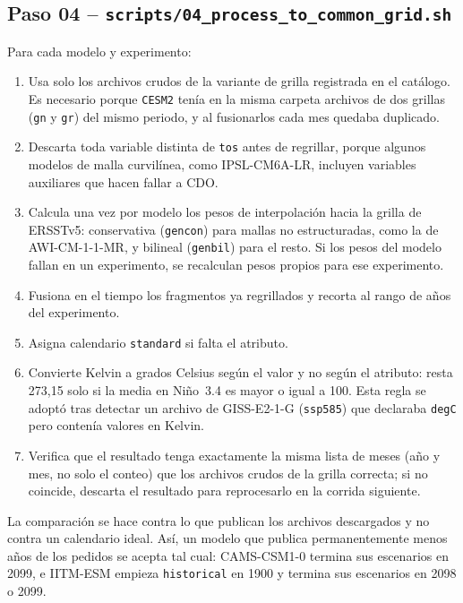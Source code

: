 \subsection{Paso 04 -- \texttt{scripts/04\_process\_to\_common\_grid.sh}}
\label{sec:paso04}
Para cada modelo y experimento:
\begin{enumerate}[label=(\arabic*)]
\item Usa solo los archivos crudos de la variante de grilla registrada en el catálogo. Es necesario porque \texttt{CESM2} tenía en la misma carpeta archivos de dos grillas (\texttt{gn} y \texttt{gr}) del mismo periodo, y al fusionarlos cada mes quedaba duplicado.
\item Descarta toda variable distinta de \texttt{tos} antes de regrillar, porque algunos modelos de malla curvilínea, como IPSL-CM6A-LR, incluyen variables auxiliares que hacen fallar a CDO.
\item Calcula una vez por modelo los pesos de interpolación hacia la grilla de ERSSTv5: conservativa (\texttt{gencon}) para mallas no estructuradas, como la de AWI-CM-1-1-MR, y bilineal (\texttt{genbil}) para el resto. Si los pesos del modelo fallan en un experimento, se recalculan pesos propios para ese experimento.
\item Fusiona en el tiempo los fragmentos ya regrillados y recorta al rango de años del experimento.
\item Asigna calendario \texttt{standard} si falta el atributo.
\item Convierte Kelvin a grados Celsius según el valor y no según el atributo: resta 273{,}15 solo si la media en Niño~3.4 es mayor o igual a 100. Esta regla se adoptó tras detectar un archivo de GISS-E2-1-G (\texttt{ssp585}) que declaraba \texttt{degC} pero contenía valores en Kelvin.
\item Verifica que el resultado tenga exactamente la misma lista de meses (año y mes, no solo el conteo) que los archivos crudos de la grilla correcta; si no coincide, descarta el resultado para reprocesarlo en la corrida siguiente.
\end{enumerate}
La comparación se hace contra lo que publican los archivos descargados y no contra un calendario ideal. Así, un modelo que publica permanentemente menos años de los pedidos se acepta tal cual: CAMS-CSM1-0 termina sus escenarios en 2099, e IITM-ESM empieza \texttt{historical} en 1900 y termina sus escenarios en 2098 o 2099.

